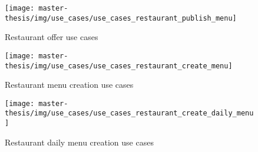 \begin{figure}[h]
  \centering
  \texttt{[image: master-thesis/img/use\_cases/use\_cases\_restaurant\_publish\_menu]}
  \caption{Restaurant offer use cases}
\end{figure}

\begin{figure}[h]
  \centering
  \texttt{[image: master-thesis/img/use\_cases/use\_cases\_restaurant\_create\_menu]}
  \caption{Restaurant menu creation use cases}
\end{figure}

\begin{figure}[h]
  \centering
  \texttt{[image: master-thesis/img/use\_cases/use\_cases\_restaurant\_create\_daily\_menu]}
  \caption{Restaurant daily menu creation use cases}
\end{figure}



























